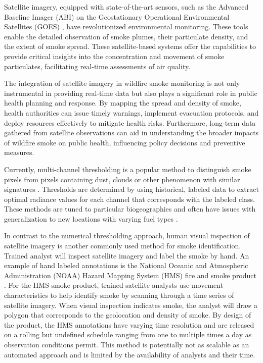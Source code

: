 \documentclass{article}
\begin{document}
Satellite imagery, equipped with state-of-the-art sensors, such as the Advanced Baseline Imager (ABI) on the Geostationary Operational Environmental Satellites (GOES) \cite{goes}, have revolutionized environmental monitoring. These tools enable the detailed observation of smoke plumes, their particulate density, and the extent of smoke spread. These satellite-based systems offer the capabilities to provide critical insights into the concentration and movement of smoke particulates, facilitating real-time assessments of air quality.

The integration of satellite imagery in wildfire smoke monitoring is not only instrumental in providing real-time data but also plays a significant role in public health planning and response. By mapping the spread and density of smoke, health authorities can issue timely warnings, implement evacuation protocols, and deploy resources effectively to mitigate health risks. Furthermore, long-term data gathered from satellite observations can aid in understanding the broader impacts of wildfire smoke on public health, influencing policy decisions and preventive measures.

Currently, multi-channel thresholding is a popular method to distinguish smoke pixels from pixels containing dust, clouds or other phenomenon with similar signatures \cite{threshold}. Thresholds are determined by using historical, labeled data to extract optimal radiance values for each channel that corresponds with the labeled class. These methods are tuned to particular biogeographies and often have issues with generalization to new locations with varying fuel types \cite{thresh_geog}.

In contrast to the numerical thresholding approach, human visual inspection of satellite imagery is another commonly used method for smoke identification. Trained analyst will inspect satellite imagery and label the smoke by hand. An example of hand labeled annotations is the National Oceanic and Atmospheric Administration (NOAA) Hazard Mapping System (HMS) fire and smoke product \cite{hms, hms_val}. For the HMS smoke product, trained satellite analysts use movement characteristics to help identify smoke by scanning through a time series of satellite imagery. When visual inspection indicates smoke, the analyst will draw a polygon that corresponds to the geolocation and density of smoke. By design of the product, the HMS annotations have varying time resolution and are released on a rolling but undefined schedule ranging from one to multiple times a day as observation conditions permit. This method is potentially not as scalable as an automated approach and is limited by the availability of analysts and their time. 
\end{document}
